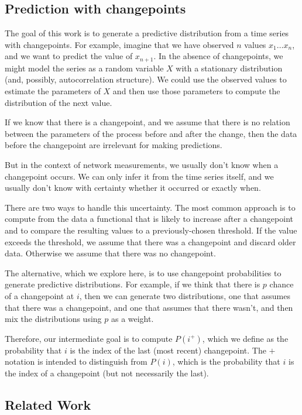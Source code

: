 \documentclass[twocolumn,11pt]{article}
\begin{document}
\subsection{Prediction with changepoints}

The goal of this work is to generate a predictive distribution from a
time series with changepoints.  For example, imagine that we have
observed $n$ values $x_1 \ldots x_n$, and we want to predict
the value of $x_{n+1}$.  In the absence of changepoints, we might model
the series as a random variable $X$ with a stationary distribution
(and, possibly, autocorrelation structure).  We could use the observed
values to estimate the parameters of $X$ and then use those parameters
to compute the distribution of the next value.

If we know that there is a changepoint, and we assume that there is
no relation between the parameters of the process before and after
the change, then the data before the changepoint are irrelevant
for making predictions.

But in the context of network measurements, we usually don't know when
a changepoint occurs.  We can only infer it from the time series
itself, and we usually don't know with certainty whether it occurred or
exactly when.

There are two ways to handle this uncertainty.  The most common
approach is to compute from the data a functional that is likely to
increase after a changepoint and to compare the resulting values to a
previously-chosen threshold.  If the value exceeds the threshold, we
assume that there was a changepoint and discard older data.  Otherwise
we assume that there was no changepoint.

The alternative, which we explore here, is to use changepoint
probabilities to generate predictive distributions.  For example, if
we think that there is $p$ chance of a changepoint at $i$, then we
can generate two distributions, one that assumes that there was a
changepoint, and one that assumes that there wasn't, and then mix
the distributions using $p$ as a weight.

Therefore, our intermediate goal is to compute
$P(i^+)$, which we define as the probability that $i$ is the index
of the last (most recent) changepoint.  The $+$ notation is intended
to distinguish from $P(i)$, which is the probability that $i$
is the index of a changepoint (but not necessarily the last).


\subsection{Related Work}
\end{document}
